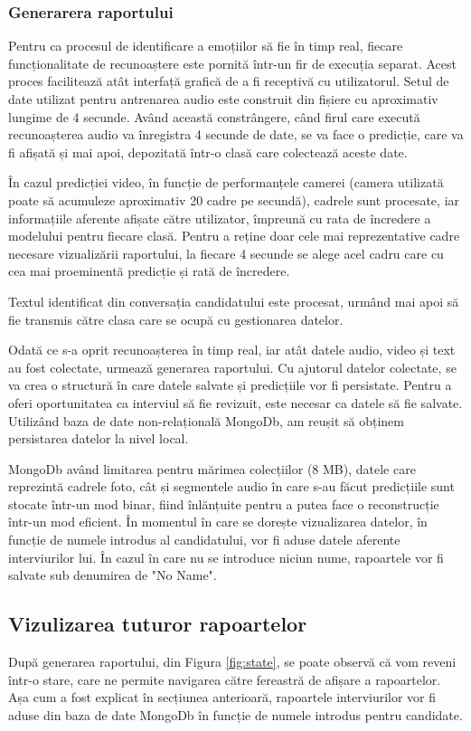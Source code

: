 \documentclass[a4paper, 12pt]{report}
\begin{document}
	\subsubsection{Generarera raportului}
	Pentru ca procesul de identificare a emoțiilor să fie în timp real, fiecare funcționalitate de recunoaștere este pornită într-un fir de execuția separat. Acest proces facilitează atât interfață grafică de a fi receptivă cu utilizatorul. Setul de date utilizat pentru antrenarea audio este construit din fișiere cu aproximativ lungime de 4 secunde. Având această constrângere, când firul care execută recunoașterea audio va înregistra 4 secunde de date, se va face o predicție, care va fi afișată și mai apoi, depozitată într-o clasă care colectează aceste date. 

	În cazul predicției video, în funcție de performanțele camerei (camera utilizată poate să acumuleze aproximativ 20 cadre pe secundă), cadrele sunt procesate, iar informațiile aferente afișate către utilizator, împreună cu rata de încredere a modelului pentru fiecare clasă. Pentru a reține doar cele mai reprezentative cadre necesare vizualizării raportului, la fiecare 4 secunde se alege acel cadru care cu cea mai proeminentă predicție și rată de încredere.

	Textul identificat din conversația candidatului este procesat, urmând mai apoi să fie transmis către clasa care se ocupă cu gestionarea datelor. 	

	Odată ce s-a oprit recunoașterea în timp real, iar atât datele audio, video și text au fost colectate, urmează generarea raportului. Cu ajutorul datelor colectate, se va crea o structură în care datele salvate și predicțiile vor fi persistate. Pentru a oferi oportunitatea ca interviul să fie revizuit, este necesar ca datele să fie salvate. Utilizând baza de date non-relațională MongoDb, am reușit să obținem persistarea datelor la nivel local.

	MongoDb având limitarea pentru mărimea colecțiilor (8 MB), datele care reprezintă cadrele foto, cât și segmentele audio în care s-au făcut predicțiile sunt stocate într-un mod binar, fiind înlănțuite pentru a putea face o reconstrucție într-un mod eficient. În momentul în care se dorește vizualizarea datelor, în funcție de numele introdus al candidatului, vor fi aduse datele aferente interviurilor lui. În cazul în care nu se introduce niciun nume, rapoartele vor fi salvate sub denumirea de "No Name".
	\clearpage
	\subsection{Vizulizarea tuturor rapoartelor}
	După generarea raportului, din Figura \ref{fig:state}, se poate observă că vom reveni într-o stare, care ne permite navigarea către fereastră de afișare a rapoartelor. Așa cum a fost explicat în secțiunea anterioară, rapoartele interviurilor vor fi aduse din baza de date MongoDb în funcție de numele introdus pentru candidate.
	
\end{document}
